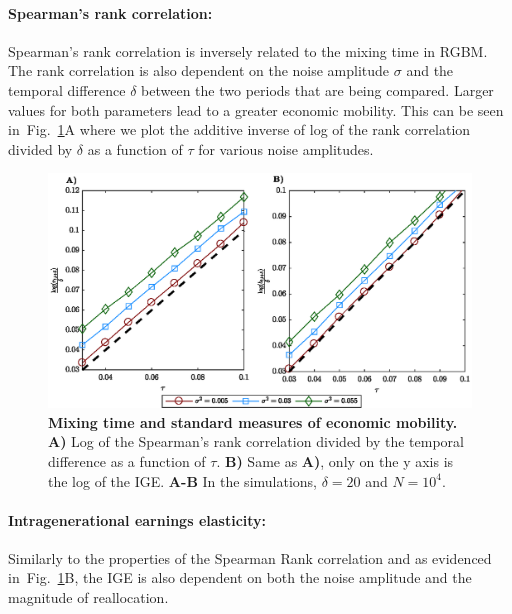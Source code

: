 \documentclass[11pt]{article}
\newcommand{\blue}[1]{{\color{blue} #1}}
\newcommand{\YB}[1]{\blue{{\it YB: #1 YB}}}
\newcommand{\fref}[1]{Fig.~\ref{fig:#1}}
\numberwithin{equation}{section}
\begin{document}

\paragraph{Spearman's rank correlation:} Spearman's rank correlation is inversely related to the mixing time in RGBM. The rank correlation is also dependent on the noise amplitude $\sigma$ and the temporal difference $\delta$ between the two periods that are being compared. Larger values for both parameters lead to a greater economic mobility. This can be seen in~\fref{rgbm-standard-measures}A where we plot the additive inverse of log of the rank correlation divided by $\delta$ as a function of $\tau$ for various noise amplitudes.

\begin{figure}[!htb]
\centering
\includegraphics[width=1.0\textwidth]{figs/fig_rgbm_standard_measures.eps}
\caption{\textbf{Mixing time and standard measures of economic mobility.} \textbf{A)} Log of the Spearman's rank correlation divided by the temporal difference as a function of $\tau$. \textbf{B)} Same as \textbf{A)}, only on the y axis is the log of the IGE. %
\textbf{A-B} In the simulations, $\delta = 20$ and $N = 10^4$.
\label{fig:rgbm-standard-measures}}
\end{figure}

\paragraph{Intragenerational earnings elasticity:} Similarly to the properties of the Spearman Rank correlation and as evidenced in~\fref{rgbm-standard-measures}B, the IGE is also dependent on both the noise amplitude and the magnitude of reallocation.
\end{document}
